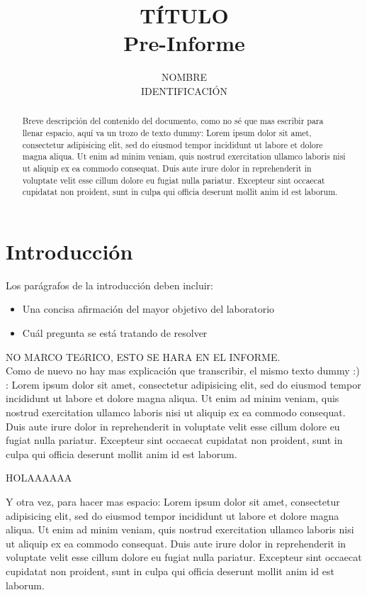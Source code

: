 \documentclass[a4paper, twocolumn, 11pt]{article}
\title{TÍTULO\\ \Large Pre-Informe}
\author{NOMBRE\\IDENTIFICACIÓN}
\date{}
\begin{document}
\maketitle
\begin{abstract}
Breve descripción del contenido del documento, como no sé que mas escribir para llenar espacio, aquí va un trozo de texto dummy: Lorem ipsum dolor sit amet, consectetur adipisicing elit, sed do eiusmod
tempor incididunt ut labore et dolore magna aliqua. Ut enim ad minim veniam,
quis nostrud exercitation ullamco laboris nisi ut aliquip ex ea commodo
consequat. Duis aute irure dolor in reprehenderit in voluptate velit esse
cillum dolore eu fugiat nulla pariatur. Excepteur sint occaecat cupidatat non
proident, sunt in culpa qui officia deserunt mollit anim id est laborum.
\end{abstract}
\section{Introducción}
\label{sec:intro}
Los parágrafos de la introducción deben incluir:
\begin{itemize}
 	\item{Una concisa afirmación del mayor objetivo del laboratorio}
 	\item{Cuál pregunta se está tratando de resolver}
 \end{itemize}
NO MARCO TEóRICO, ESTO SE HARA EN EL INFORME.\\

\noindent Como de nuevo no hay mas explicación que transcribir, el mismo texto dummy :) :
Lorem ipsum dolor sit amet, consectetur adipisicing elit, sed do eiusmod
tempor incididunt ut labore et dolore magna aliqua. Ut enim ad minim veniam,
quis nostrud exercitation ullamco laboris nisi ut aliquip ex ea commodo
consequat. Duis aute irure dolor in reprehenderit in voluptate velit esse
cillum dolore eu fugiat nulla pariatur. Excepteur sint occaecat cupidatat non
proident, sunt in culpa qui officia deserunt mollit anim id est laborum.


HOLAAAAAA


Y otra vez, para hacer mas espacio:
Lorem ipsum dolor sit amet, consectetur adipisicing elit, sed do eiusmod
tempor incididunt ut labore et dolore magna aliqua. Ut enim ad minim veniam,
quis nostrud exercitation ullamco laboris nisi ut aliquip ex ea commodo
consequat. Duis aute irure dolor in reprehenderit in voluptate velit esse
cillum dolore eu fugiat nulla pariatur. Excepteur sint occaecat cupidatat non
proident, sunt in culpa qui officia deserunt mollit anim id est laborum.
\end{document}
